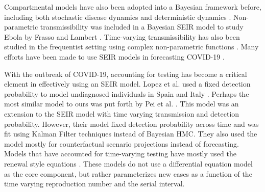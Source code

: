 \documentclass[11pt]{amsart}
\begin{document}
Compartmental models have also been adopted into a Bayesian framework before, including both stochastic disease dynamics and deterministic dynamics \cite{hotta2010bayesian}\cite{dukic2012tracking}. Non-parametric transmissibility was included in a Bayesian SEIR model to study Ebola by Frasso and Lambert \cite{frasso2016bayesian}. Time-varying transmissibility has also been studied in the frequentist setting using complex non-parametric functions \cite{smirnova2019forecasting}. Many efforts have been made to use SEIR models in forecasting COVID-19 \cite{giordano2020modelling}\cite{yang2020modified} \cite{bertozzi2020challenges}\cite{prem2020effect}\cite{flaxman2020estimating}.

With the outbreak of COVID-19, accounting for testing has become a critical element in effectively using an SEIR model. Lopez et al. used a fixed detection probability to model undiagnosed individuals in Spain and Italy \cite{lopez2020modified}.  Perhaps the most similar model to ours was put forth by Pei et al. \cite{pei2020differential}. This model was an extension to the SEIR model with time varying transmission and detection probability. However, their model fixed detection probability across time and was fit using Kalman Filter techniques instead of Bayesian HMC. They also used the model mostly for counterfactual scenario projections instead of forecasting. Models that have accounted for time-varying testing have mostly used the renewal style equations \cite{abbott2020estimating}\cite{flaxman2020estimating}. These models do not use a differential equation model as the core component, but rather parameterizes new cases as a function of the time varying reproduction number and the serial interval. 
\end{document}
